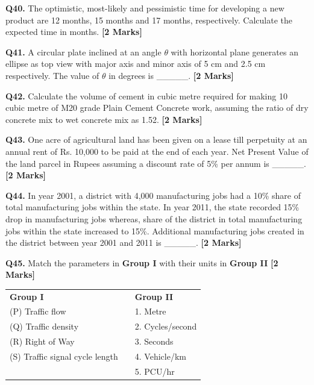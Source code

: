 \documentclass[11pt]{article}
\newcommand{\questionb}[2]{
    \noindent\textbf{Q#2.} #1 \hfill \textbf{[2 Marks]}
}
\begin{document}
\vspace{0.5cm}

\questionb{The optimistic, most-likely and pessimistic time for developing a new product are 12 months, 15 months and 17 months, respectively. Calculate the expected time in months.}{40}

\vspace{0.5cm}

\questionb{A circular plate inclined at an angle $\theta$ with horizontal plane generates an ellipse as top view with major axis and minor axis of 5 cm and 2.5 cm respectively. The value of $\theta$ in degrees is \_\_\_\_\_.}{41}

\vspace{0.5cm}

\questionb{Calculate the volume of cement in cubic metre required for making 10 cubic metre of M20 grade Plain Cement Concrete work, assuming the ratio of dry concrete mix to wet concrete mix as 1.52.}{42}

\vspace{0.5cm}

\questionb{One acre of agricultural land has been given on a lease till perpetuity at an annual rent of Rs. 10,000 to be paid at the end of each year. Net Present Value of the land parcel in Rupees assuming a discount rate of 5\% per annum is \_\_\_\_\_.}{43}

\vspace{0.5cm}

\questionb{In year 2001, a district with 4,000 manufacturing jobs had a 10\% share of total manufacturing jobs within the state. In year 2011, the state recorded 15\% drop in manufacturing jobs whereas, share of the district in total manufacturing jobs within the state increased to 15\%. Additional manufacturing jobs created in the district between year 2001 and 2011 is \_\_\_\_\_.}{44}

\vspace{0.5cm}

\questionb{Match the parameters in \textbf{Group I} with their units in \textbf{Group II}}{45}

\begin{tabularx}{\linewidth}{lXl}
\textbf{Group I} & & \textbf{Group II} \\
(P) Traffic flow & & 1. Metre \\
(Q) Traffic density & & 2. Cycles/second \\
(R) Right of Way & & 3. Seconds \\
(S) Traffic signal cycle length & & 4. Vehicle/km \\
& & 5. PCU/hr \\
\end{tabularx}
\end{document}
